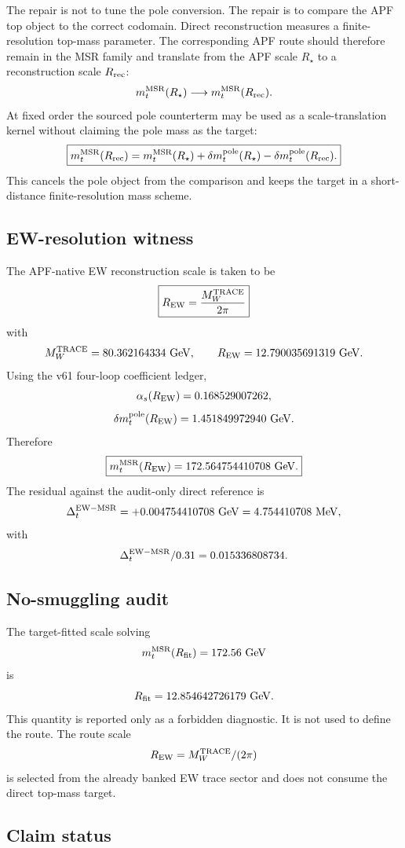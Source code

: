 The repair is not to tune the pole conversion.  The repair is to compare the APF top object to the correct codomain.  Direct reconstruction measures a finite-resolution top-mass parameter.  The corresponding APF route should therefore remain in the MSR family and translate from the APF scale $R_\star$ to a reconstruction scale $R_{\rm rec}$:
\[
 m_t^{\rm MSR}(R_\star)
 \longrightarrow
 m_t^{\rm MSR}(R_{\rm rec}).
\]
At fixed order the sourced pole counterterm may be used as a scale-translation kernel without claiming the pole mass as the target:
\[
\boxed{
 m_t^{\rm MSR}(R_{\rm rec})
 =
 m_t^{\rm MSR}(R_\star)
 +\delta m_t^{\rm pole}(R_\star)
 -\delta m_t^{\rm pole}(R_{\rm rec}).
 }
\]
This cancels the pole object from the comparison and keeps the target in a short-distance finite-resolution mass scheme.

\subsection{EW-resolution witness}

The APF-native EW reconstruction scale is taken to be
\[
\boxed{
 R_{\rm EW}={M_W^{\rm TRACE}\over 2\pi}
 }
\]
with
\[
 M_W^{\rm TRACE}=80.362164334\ {\rm GeV},
\qquad
 R_{\rm EW}=12.790035691319\ {\rm GeV}.
\]
Using the v61 four-loop coefficient ledger,
\[
\alpha_s(R_{\rm EW})=0.168529007262,
\]
\[
\delta m_t^{\rm pole}(R_{\rm EW})=1.451849972940\ {\rm GeV}.
\]
Therefore
\[
\boxed{
 m_t^{\rm MSR}(R_{\rm EW})
 =172.564754410708\ {\rm GeV}.
 }
\]
The residual against the audit-only direct reference is
\[
\Delta_t^{\rm EW-MSR}=+0.004754410708\ {\rm GeV}
=4.754410708\ {\rm MeV},
\]
with
\[
\Delta_t^{\rm EW-MSR}/0.31=0.015336808734.
\]

\subsection{No-smuggling audit}

The target-fitted scale solving
\[
 m_t^{\rm MSR}(R_{\rm fit})=172.56\ {\rm GeV}
\]
is
\[
R_{\rm fit}=12.854642726179\ {\rm GeV}.
\]
This quantity is reported only as a forbidden diagnostic.  It is not used to define the route.  The route scale
\[
 R_{\rm EW}=M_W^{\rm TRACE}/(2\pi)
\]
is selected from the already banked EW trace sector and does not consume the direct top-mass target.

\subsection{Claim status}


